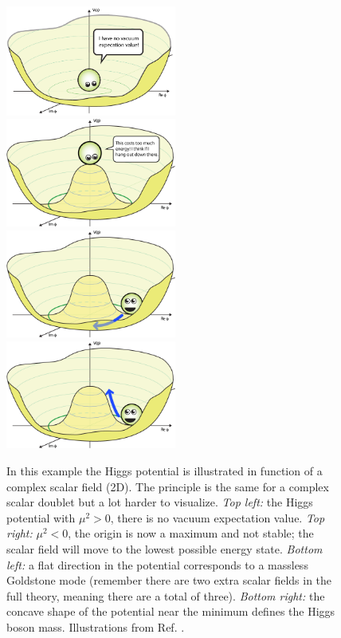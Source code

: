 \begin{figure}
\includegraphics[width=0.5\textwidth]{chapter1/img/BoringPotential}
\includegraphics[width=0.5\textwidth]{chapter1/img/Higgs-Potential-lookdown}
\includegraphics[width=0.5\textwidth]{chapter1/img/Higgs-Potential-Goldstone}
\includegraphics[width=0.5\textwidth]{chapter1/img/Higgs-Potential-radial}
\caption{In this example the Higgs potential is illustrated in function of a complex scalar field (2D). The principle is the same for a complex scalar doublet but a lot harder to visualize. \textit{Top left:} the Higgs potential with $\mu^2 > 0$, there is no vacuum expectation value. \textit{Top right:} $\mu^2 < 0$, the origin is now a maximum and not stable; the scalar field will move to the lowest possible energy state. \textit{Bottom left:} a flat direction in the potential corresponds to a massless Goldstone mode (remember there are two extra scalar fields in the full theory, meaning there are a total of three). \textit{Bottom right:} the concave shape of the potential near the minimum defines the Higgs boson mass. Illustrations from Ref. \cite{flip}.}
\label{fig:BEHpotential}
\end{figure}


